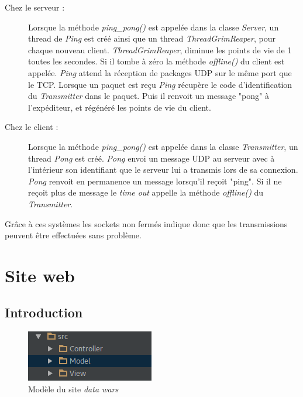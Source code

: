 \documentclass[a4paper, titlepage]{livret}
\begin{document}
\begin{description}
  \item[Chez le serveur : ]
  Lorsque la méthode \textit{ping\_pong()} est appelée dans la classe \textit{Server}, un thread de \textit{Ping} est créé ainsi que un thread \textit{ThreadGrimReaper}, pour chaque nouveau client. 
\textit{ThreadGrimReaper}, diminue les points de vie de 1 toutes les secondes. Si il tombe à zéro la méthode \textit{offline()} du client est appelée.
\textit{Ping} attend la réception de packages UDP sur le même port que le TCP. Lorsque un paquet est reçu \textit{Ping} récupère le code d’identification du \textit{Transmitter} dans le paquet. Puis il renvoit un message "pong" à l’expéditeur, et régénéré les points de vie du client.
  
  \item[Chez le client : ]
  Lorsque la méthode \textit{ping\_pong()} est appelée dans la classe \textit{Transmitter}, un thread \textit{Pong} est créé. \textit{Pong} envoi un message UDP au serveur avec à l’intérieur son identifiant que le serveur lui a transmis lors de sa connexion. \textit{Pong} renvoit en permanence un message lorsqu’il reçoit "ping". Si il ne reçoit plus de message le \textit{time out} appelle la méthode \textit{offline()} du \textit{Transmitter}.
\end{description}

Grâce à ces systèmes les sockets non fermés indique donc que les transmissions peuvent être effectuées sans problème.


\chapter{Site web}
\section{Introduction}

	\begin{figure}[th]
		\begin{center}
		\includegraphics[scale=0.4]{Assets/mvc.png}
      		\caption{Modèle du site \textit{data wars}}
      		\label{fig1}
     		\end{center}
	\end{figure}
\end{document}
